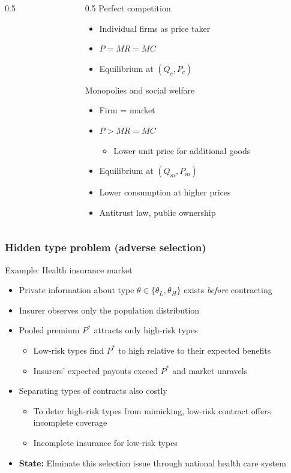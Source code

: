 \documentclass[aspectratio=169]{beamer}
\begin{document}
\begin{frame}
\begin{columns}
\begin{column}{0.5\textwidth}
\begin{center}
\begin{tikzpicture}[scale=0.85]
\end{tikzpicture}
\end{center}
\end{column}
\begin{column}{0.5\textwidth}
  Perfect competition
  \begin{itemize}\setlength\itemsep{3pt}
  \item Individual firms as price taker
  \item $P=MR=MC$
\item Equilibrium at $(Q_c, P_c)$
\end{itemize}\medskip
Monopolies and social welfare
\begin{itemize}\setlength\itemsep{3pt}
\item Firm = market
  \item $P>MR=MC$
  \begin{itemize}
    \item Lower unit price for additional goods
  \end{itemize}
  \item Equilibrium at $(Q_m, P_m)$
  \item Lower consumption at higher prices
  \item Antitrust law, public ownership
\end{itemize}
\end{column}
\end{columns}
\end{frame}

\begin{frame}
\frametitle{Hidden type problem (adverse selection)}
Example: Health insurance market
\begin{itemize}\setlength\itemsep{3pt}
    \item Private information about type $\theta \in \{\theta_L, \theta_H\}$ exists \textit{before} contracting
    \item Insurer observes only the population distribution
    \item Pooled premium $P^*$ attracts only high-risk types 
    \begin{itemize}\setlength\itemsep{3pt}
      \item  Low-risk types find $P^*$ to high relative to their expected benefits
      \item Insurers' expected payouts exceed $P^*$ and market unravels
    \end{itemize}
    \item Separating types of contracts also costly
    \begin{itemize}\setlength\itemsep{3pt}
      \item To deter high-risk types from mimicking, low-risk contract offers incomplete coverage
      \item Incomplete insurance for low-risk types
    \end{itemize}
    \item \textbf{State:} Elminate this selection issue through national health care system
\end{itemize}
\end{frame}
\end{document}
